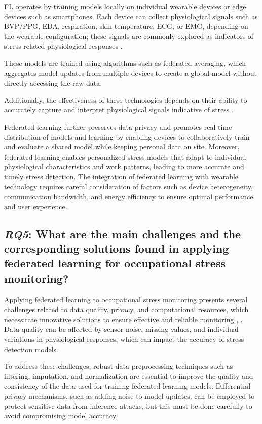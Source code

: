 \documentclass[12pt]{article}
\begin{document}
FL operates by training models locally on individual wearable devices or edge devices such as smartphones. Each device can collect physiological signals such as BVP/PPG, EDA, respiration, skin temperature, ECG, or EMG, depending on the wearable configuration; these signals are commonly explored as indicators of stress-related physiological responses \cite{abdulrahman_alahmadi_32bc288c}. 

These models are trained using algorithms such as federated averaging, which aggregates model updates from multiple devices to create a global model without directly accessing the raw data.  

Additionally, the effectiveness of these technologies depends on their ability to accurately capture and interpret physiological signals indicative of stress \cite{ahmad_almadhor_8cc2e670}.

Federated learning further preserves data privacy and promotes real-time distribution of models and learning by enabling devices to collaboratively train and evaluate a shared model while keeping personal data on site. Moreover, federated learning enables personalized stress models that adapt to individual physiological characteristics and work patterns, leading to more accurate and timely stress detection. The integration of federated learning with wearable technology requires careful consideration of factors such as device heterogeneity, communication bandwidth, and energy efficiency to ensure optimal performance and user experience.

\subsection{\textit{RQ5}: What are the main challenges and the corresponding solutions found in applying federated learning for occupational stress monitoring?}


Applying federated learning to occupational stress monitoring presents several challenges related to data quality, privacy, and computational resources, which necessitate innovative solutions to ensure effective and reliable monitoring \cite{ahmad_almadhor_8cc2e670}, \cite{abdulrahman_alahmadi_32bc288c}. Data quality can be affected by sensor noise, missing values, and individual variations in physiological responses, which can impact the accuracy of stress detection models. 

To address these challenges, robust data preprocessing techniques such as filtering, imputation, and normalization are essential to improve the quality and consistency of the data used for training federated learning models. Differential privacy mechanisms, such as adding noise to model updates, can be employed to protect sensitive data from inference attacks, but this must be done carefully to avoid compromising model accuracy. 
\end{document}
